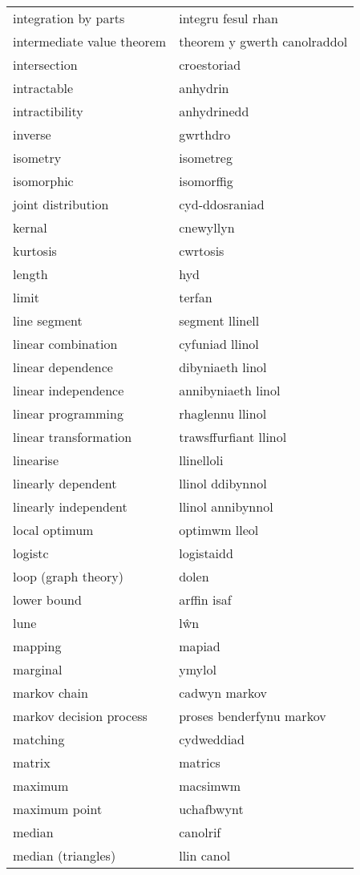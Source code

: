 \begin{supertabular}{p{0.22\textwidth}p{0.22\textwidth}}
integration by parts & integru fesul rhan \\
intermediate value theorem & theorem y gwerth canolraddol \\
intersection & croestoriad \\
intractable & anhydrin \\
intractibility & anhydrinedd \\
inverse & gwrthdro \\
isometry & isometreg \\
isomorphic & isomorffig \\
joint distribution & cyd-ddosraniad \\
kernal & cnewyllyn \\
kurtosis & cwrtosis \\
length & hyd \\
limit & terfan \\
line segment & segment llinell \\
linear combination & cyfuniad llinol \\
linear dependence & dibyniaeth linol \\
linear independence & annibyniaeth linol \\
linear programming & rhaglennu llinol \\
linear transformation & trawsffurfiant llinol \\
linearise & llinelloli \\
linearly dependent & llinol ddibynnol \\
linearly independent & llinol annibynnol \\
local optimum & optimwm lleol \\
logistc & logistaidd \\
loop (graph theory) & dolen \\
lower bound & arffin isaf \\
lune & lŵn \\
mapping & mapiad \\
marginal & ymylol \\
markov chain & cadwyn markov \\
markov decision process & proses benderfynu markov \\
matching & cydweddiad \\
matrix & matrics \\
maximum & macsimwm \\
maximum point & uchafbwynt \\
median & canolrif \\
median (triangles) & llin canol \\

\end{supertabular}
